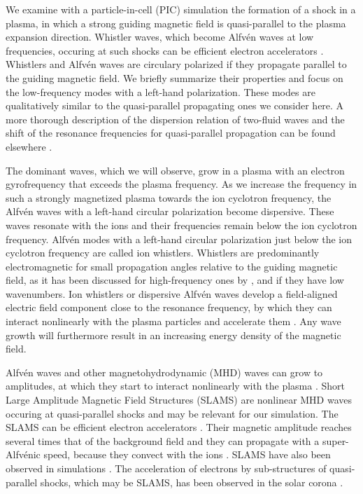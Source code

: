 \documentclass[structabstract]{aa}
\begin{document}
We examine with a particle-in-cell (PIC) simulation the formation of a 
shock in a plasma, in which a strong guiding magnetic field is quasi-parallel 
to the plasma expansion direction. Whistler waves, which become Alfv\'en 
waves at low frequencies, occuring at such shocks can be efficient electron 
accelerators \citep{Oblique3,Injection3,Gyrosurf,ANOTHERSLAM,Ken}. Whistlers 
and Alfv\'en waves are circulary polarized if they propagate parallel to the 
guiding magnetic field. We briefly summarize their properties and focus on the 
low-frequency modes with a left-hand polarization. These modes are 
qualitatively similar to the quasi-parallel propagating ones we consider
here. A more thorough description of the dispersion relation of two-fluid 
waves and the shift of the resonance frequencies for quasi-parallel 
propagation can be found elsewhere \citep{Treumann}. 

The dominant waves, which we will observe, grow in 
a plasma with an electron gyrofrequency that exceeds the plasma frequency. 
As we increase the frequency in such a strongly magnetized plasma towards
the ion cyclotron frequency, the Alfv\'en waves with a left-hand circular 
polarization become dispersive. These waves resonate with the ions and their 
frequencies remain below the ion cyclotron frequency. Alfv\'en modes with a 
left-hand circular polarization just below the ion cyclotron frequency are 
called ion whistlers. Whistlers are predominantly electromagnetic for small 
propagation angles relative to the guiding magnetic field, as it has been 
discussed for high-frequency ones by \citep{Tokar}, and if they have low 
wavenumbers. Ion whistlers or dispersive Alfv\'en waves develop a field-aligned 
electric field component close to the resonance frequency, by which they can 
interact nonlinearly with the plasma particles and accelerate them \citep{Ken}.
Any wave growth will furthermore result in an increasing energy density of 
the magnetic field.

Alfv\'en waves and other magnetohydrodynamic (MHD) waves can grow to amplitudes, 
at which they start to interact nonlinearly with the plasma \citep{STASI}. 
Short Large Amplitude Magnetic Field Structures (SLAMS) are nonlinear MHD 
waves occuring at quasi-parallel shocks and may be relevant for our 
simulation. The SLAMS can be efficient electron accelerators \citep{CME2}. 
Their magnetic amplitude reaches several times that of the background field 
and they can propagate with a super-Alfv\'enic speed, because they convect 
with the ions \citep{SLAMSPEED,SLAMS}. SLAMS have also been observed in 
simulations \citep{Scholer}. The acceleration of electrons by sub-structures 
of quasi-parallel shocks, which may be SLAMS, has been observed in the solar 
corona \citep{CME}. 
\end{document}
